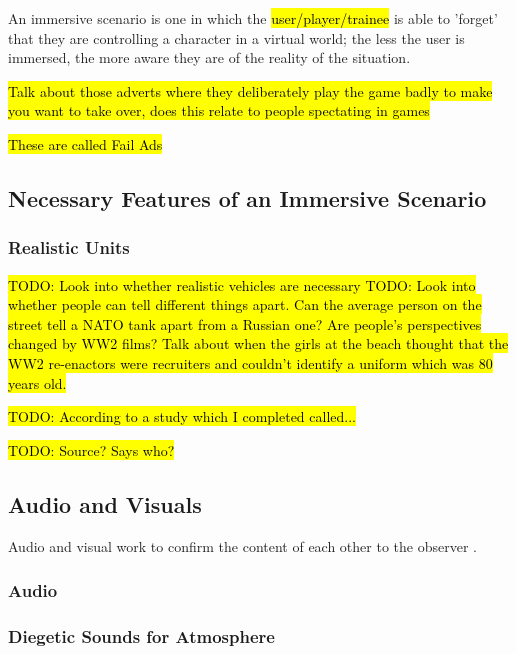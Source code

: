\documentclass{article}
\begin{document}
An immersive scenario is one in which the \hl{user/player/trainee} is able to 'forget' that they are controlling a character in a virtual world; the less the user is immersed, the more aware they are of the reality of the situation.

\hl{Talk about those adverts where they deliberately play the game badly to make you want to take over, does this relate to people spectating in games}


\hl{These are called Fail Ads} 

\subsection{Necessary Features of an Immersive Scenario}

\subsubsection{Realistic Units}

\hl{TODO: Look into whether realistic vehicles are necessary
TODO: Look into whether people can tell different things apart. Can the average person on the street tell a NATO tank apart from a Russian one? Are people's perspectives changed by WW2 films? Talk about when the girls at the beach thought that the WW2 re-enactors were recruiters and couldn't identify a uniform which was 80 years old.}

\hl{TODO: According to a study which I completed called... }

\hl{TODO: Source? Says who?}

\subsection{Audio and Visuals}

Audio and visual work to confirm the content of each other to the observer \cite{diegeticSounds1}. 

\subsubsection{Audio}

\subsubsection{Diegetic Sounds for Atmosphere}
\end{document}
